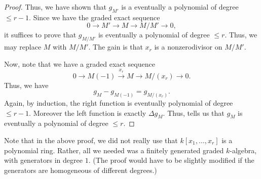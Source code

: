 \documentclass[12pt]{article}
\begin{document}
\begin{proof}
	Thus, we have shown that $g_{M'}$ is a eventually a polynomial of degree $\le r - 1$. Since we have the graded exact sequence
	\begin{equation*} 
		0 \to M' \to M \to M/M' \to 0,
	\end{equation*}
	it suffices to prove that $g_{M/M'}$ is eventually a polynomial of degree $\le r$. Thus, we may replace $M$ with $M/M'$. The gain is that $x_{r}$ is a nonzerodivisor on $M/M'$.

	Now, note that we have a graded exact sequence
	\begin{equation*} 
		0 \to M(-1) \xrightarrow{x_{r}} M \to M/(x_{r}) \to 0.
	\end{equation*}
	Thus, we have
	\begin{equation*} 
		g_{M} - g_{M(-1)} = g_{M/(x_{r})}.
	\end{equation*}
	Again, by induction, the right function is eventually polynomial of degree $\le r - 1$. Moreover the left function is exactly $\Delta g_{M}$. Thus,  tells us that $g_{M}$ is eventually a polynomial of degree $\le r$. 
\end{proof}

\begin{rem}
	Note that in the above proof, we did not really use that $k[x_{1}, \ldots, x_{r}]$ is a polynomial ring. Rather, all we needed was a finitely generated graded $k$-algebra, with generators in degree $1$. (The proof would have to be slightly modified if the generators are homogeneous of different degrees.)
\end{rem}
\end{document}
